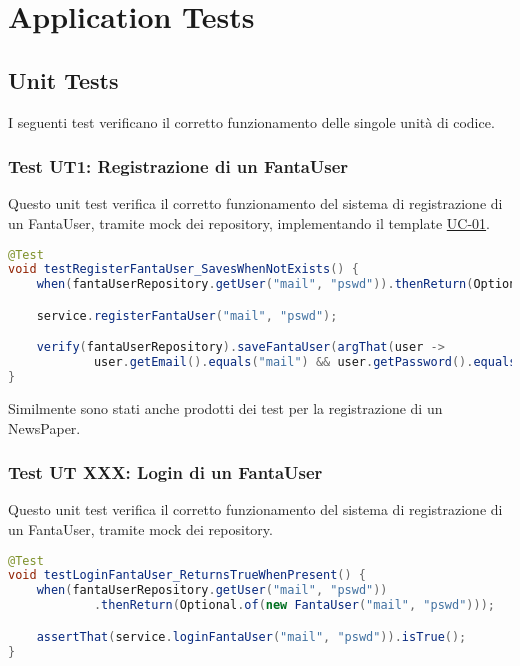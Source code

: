 \section{Application Tests}

\subsection{Unit Tests}

I seguenti test verificano il corretto funzionamento delle singole unità di codice.

\subsubsection{Test UT1: Registrazione di un FantaUser} \label{UT1}

Questo unit test verifica il corretto funzionamento del sistema di registrazione di un FantaUser, 
tramite mock dei repository, implementando il template \hyperref[UC-01]{UC-01}.

\begin{lstlisting}[language=Java]
@Test
void testRegisterFantaUser_SavesWhenNotExists() {
    when(fantaUserRepository.getUser("mail", "pswd")).thenReturn(Optional.empty());

    service.registerFantaUser("mail", "pswd");

    verify(fantaUserRepository).saveFantaUser(argThat(user ->
            user.getEmail().equals("mail") && user.getPassword().equals("pswd")));
}
\end{lstlisting}

Similmente sono stati anche prodotti dei test per la registrazione di un NewsPaper.


\subsubsection{Test UT XXX: Login di un FantaUser} \label{UT2}

Questo unit test verifica il corretto funzionamento del sistema di registrazione di un FantaUser, 
tramite mock dei repository.

\begin{lstlisting}[language=Java]
@Test
void testLoginFantaUser_ReturnsTrueWhenPresent() {
    when(fantaUserRepository.getUser("mail", "pswd"))
            .thenReturn(Optional.of(new FantaUser("mail", "pswd")));

    assertThat(service.loginFantaUser("mail", "pswd")).isTrue();
}
\end{lstlisting}

